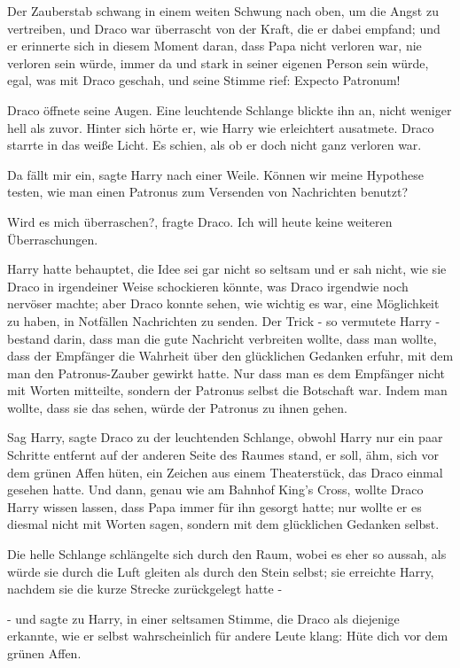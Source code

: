 Der Zauberstab schwang in einem weiten Schwung nach oben, um die Angst zu
vertreiben, und Draco war überrascht von der Kraft, die er dabei empfand; und er
erinnerte sich in diesem Moment daran, dass Papa nicht verloren war, nie
verloren sein würde, immer da und stark in seiner eigenen Person sein würde,
egal, was mit Draco geschah, und seine Stimme rief: \glqq{}Expecto Patronum!

Draco öffnete seine Augen. Eine leuchtende Schlange blickte ihn an, nicht
weniger hell als zuvor. Hinter sich hörte er, wie Harry wie erleichtert
ausatmete. Draco starrte in das weiße Licht. Es schien, als ob er doch nicht
ganz verloren war.

\glqq{}Da fällt mir ein\grqq{}, sagte Harry nach einer Weile. \glqq{}Können wir
meine Hypothese testen, wie man einen Patronus zum Versenden von Nachrichten
benutzt?\grqq{}

\glqq{}Wird es mich überraschen?\grqq{}, fragte Draco. \glqq{}Ich will heute keine
weiteren Überraschungen.\grqq{}

Harry hatte behauptet, die Idee sei gar nicht so seltsam und er sah nicht, wie
sie Draco in irgendeiner Weise schockieren könnte, was Draco irgendwie noch
nervöser machte; aber Draco konnte sehen, wie wichtig es war, eine Möglichkeit
zu haben, in Notfällen Nachrichten zu senden. Der Trick - so vermutete Harry -
bestand darin, dass man die gute Nachricht verbreiten wollte, dass man wollte,
dass der Empfänger die Wahrheit über den glücklichen Gedanken erfuhr, mit dem
man den Patronus-Zauber gewirkt hatte. Nur dass man es dem Empfänger nicht mit
Worten mitteilte, sondern der Patronus selbst die Botschaft war. Indem man
wollte, dass sie das sehen, würde der Patronus zu ihnen gehen.\grqq{}

Sag Harry\grqq{}, sagte Draco zu der leuchtenden Schlange, obwohl Harry nur ein
paar Schritte entfernt auf der anderen Seite des Raumes stand, \glqq{}er soll,
ähm, sich vor dem grünen Affen hüten\grqq{}, ein Zeichen aus einem Theaterstück,
das Draco einmal gesehen hatte. Und dann, genau wie am Bahnhof King's Cross,
wollte Draco Harry wissen lassen, dass Papa immer für ihn gesorgt hatte; nur
wollte er es diesmal nicht mit Worten sagen, sondern mit dem glücklichen
Gedanken selbst.

Die helle Schlange schlängelte sich durch den Raum, wobei es eher so aussah, als
würde sie durch die Luft gleiten als durch den Stein selbst; sie erreichte
Harry, nachdem sie die kurze Strecke zurückgelegt hatte -

- und sagte zu Harry, in einer seltsamen Stimme, die Draco als diejenige
erkannte, wie er selbst wahrscheinlich für andere Leute klang: \glqq{}Hüte dich
vor dem grünen Affen.\grqq{}

